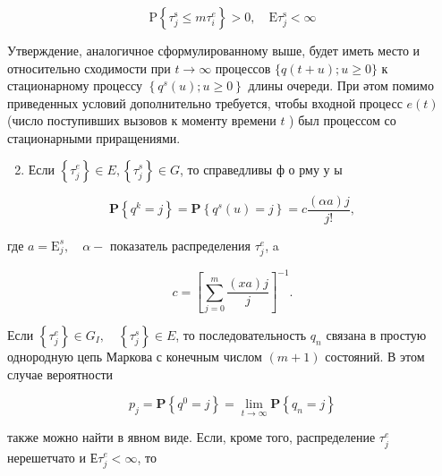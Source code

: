 \documentclass[10pt]{article}
\begin{document}
\[

\mathrm{P}\left\{\tau_{j}^{\mathrm{s}} \leqslant m \tau_{i}^{e}\right\}>0, \quad \mathrm{E} \tau_{j}^{\mathrm{s}}<\infty

\]



Утверждение, аналогичное сформулированному выше, будет иметь место и относительно сходимости при $t \rightarrow \infty$ процессов $\{q(t+u) ; u \geqslant 0\}$ к стационарному процессу $\left\{q^{s}(u) ; u \geqslant 0\right\}$ длины очереди. При әтом помимо приведенных условий дополнительно требуется, чтобы входной процесс $e(t)$ (число поступивших вызовов к моменту времени $t$ ) был процессом со стационарными приращениями.



\begin{enumerate}

  \setcounter{enumi}{1}

  \item Если $\left\{\tau_{j}^{e}\right\} \in E,\left\{\tau_{j}^{s}\right\} \in G$, то справедливы ф о рму у ы

\end{enumerate}



\[

\mathbf{P}\left\{q^{k}=j\right\}=\mathbf{P}\left\{q^{s}(u)=j\right\}=c \frac{(\alpha a) j}{j !},

\]



где $a=\mathrm{E}_{j}^{s}, \quad \alpha-$ показатель распределения $\tau_{j}^{e}$, a



\[

c=\left[\sum_{j=0}^{m} \frac{(x a) j}{j}\right]^{-1} .

\]



Если $\left\{\tau_{j}^{e}\right\} \in G_{I}, \quad\left\{\tau_{j}^{s}\right\} \in E$, то последовательность $q_{n}$ связана в простую однородную цепь Маркова с конечным числом $(m+1)$ состояний. В этом случае вероятности



\[

p_{j}=\mathbf{P}\left\{q^{0}=j\right\}=\lim _{t \rightarrow \infty} \mathbf{P}\left\{q_{n}=j\right\}

\]



также можно найти в явном виде. Если, кроме того, распределение $\tau_{j}^{e}$ нерешетчато и $Е \tau_{j}^{e}<\infty$, то
\end{document}
